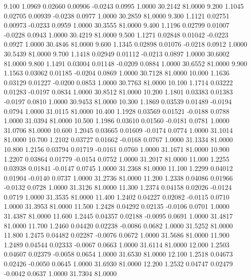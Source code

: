    9.100   1.0969   0.02660   0.00906  -0.0243   0.0995   1.0000  30.2142  81.0000
   9.200   1.1045   0.02705   0.00939  -0.0238   0.0977   1.0000  30.2859  81.0000
   9.300   1.1121   0.02751   0.00973  -0.0233   0.0959   1.0000  30.3555  81.0000
   9.400   1.1196   0.02799   0.01007  -0.0228   0.0943   1.0000  30.4219  81.0000
   9.500   1.1271   0.02848   0.01042  -0.0223   0.0927   1.0000  30.4846  81.0000
   9.600   1.1345   0.02898   0.01076  -0.0218   0.0912   1.0000  30.5439  81.0000
   9.700   1.1418   0.02949   0.01112  -0.0213   0.0897   1.0000  30.6002  81.0000
   9.800   1.1491   0.03004   0.01148  -0.0209   0.0884   1.0000  30.6552  81.0000
   9.900   1.1563   0.03062   0.01185  -0.0204   0.0869   1.0000  30.7128  81.0000
  10.000   1.1636   0.03129   0.01227  -0.0200   0.0853   1.0000  30.7763  81.0000
  10.100   1.1714   0.03222   0.01283  -0.0197   0.0834   1.0000  30.8512  81.0000
  10.200   1.1801   0.03383   0.01383  -0.0197   0.0810   1.0000  30.9453  81.0000
  10.300   1.1869   0.03539   0.01489  -0.0194   0.0794   1.0000  31.0115  81.0000
  10.400   1.1928   0.03569   0.01521  -0.0188   0.0788   1.0000  31.0394  81.0000
  10.500   1.1986   0.03610   0.01560  -0.0181   0.0781   1.0000  31.0706  81.0000
  10.600   1.2045   0.03665   0.01609  -0.0174   0.0774   1.0000  31.1014  81.0000
  10.700   1.2102   0.03727   0.01662  -0.0168   0.0767   1.0000  31.1334  81.0000
  10.800   1.2156   0.03794   0.01719  -0.0161   0.0760   1.0000  31.1671  81.0000
  10.900   1.2207   0.03864   0.01779  -0.0154   0.0752   1.0000  31.2017  81.0000
  11.000   1.2255   0.03938   0.01841  -0.0147   0.0745   1.0000  31.2368  81.0000
  11.100   1.2299   0.04012   0.01904  -0.0140   0.0737   1.0000  31.2736  81.0000
  11.200   1.2338   0.04086   0.01966  -0.0132   0.0728   1.0000  31.3126  81.0000
  11.300   1.2374   0.04158   0.02026  -0.0124   0.0719   1.0000  31.3535  81.0000
  11.400   1.2402   0.04227   0.02082  -0.0115   0.0710   1.0000  31.3953  81.0000
  11.500   1.2428   0.04292   0.02135  -0.0106   0.0701   1.0000  31.4387  81.0000
  11.600   1.2445   0.04357   0.02188  -0.0095   0.0691   1.0000  31.4817  81.0000
  11.700   1.2460   0.04420   0.02238  -0.0086   0.0682   1.0000  31.5252  81.0000
  11.800   1.2475   0.04482   0.02287  -0.0076   0.0672   1.0000  31.5686  81.0000
  11.900   1.2489   0.04544   0.02333  -0.0067   0.0663   1.0000  31.6114  81.0000
  12.000   1.2503   0.04607   0.02379  -0.0058   0.0654   1.0000  31.6530  81.0000
  12.100   1.2518   0.04673   0.02426  -0.0050   0.0645   1.0000  31.6930  81.0000
  12.200   1.2532   0.04747   0.02479  -0.0042   0.0637   1.0000  31.7304  81.0000
